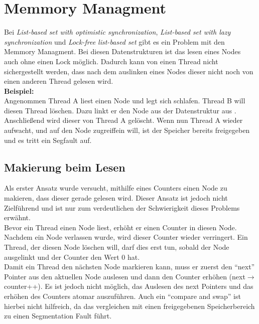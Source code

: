 \section{Memmory Managment}\label{sec:mem}
Bei \textit{List-based set with optimistic synchronization}, \textit{List-based set with lazy synchronization} und \textit{Lock-free list-based set}
gibt es ein Problem mit den Memmory Managment. Bei diesen Datenstrukturen ist das lesen eines Nodes auch ohne einen Lock möglich. 
Dadurch kann von einen Thread nicht sichergestellt werden, dass nach dem auslinken eines Nodes dieser nicht noch von einen anderen Thread gelesen wird.
\\ 
\textbf{Beispiel:}
\\ Angenommen Thread A liest einen Node und legt sich schlafen. Thread B will diesen Thread löschen. Dazu linkt er den Node aus der Datenstruktur aus
. Anschließend wird dieser von Thread A gelöscht. Wenn nun Thread A wieder aufwacht, und auf den Node zugreiffein will, ist der Speicher bereits freigegeben
und es tritt ein Segfault auf. 

\subsection{Makierung beim Lesen}
Als erster Ansatz wurde versucht, mithilfe eines Counters einen Node zu makieren, dass dieser gerade gelesen wird. Dieser Ansatz ist jedoch nicht 
Zielführend und ist nur zum verdeutlichen der Schwierigkeit dieses Problems erwähnt. \\
Bevor ein Thread einen Node liest, erhöht er einen Counter in diesen Node. Nachdem ein Node verlassen wurde, wird dieser Counter wieder verringert.
Ein Thread, der diesen Node löschen will, darf dies erst tun, sobald der Node ausgelinkt und der Counter den Wert 0 hat. \\
Damit ein Thread den nächsten Node markieren kann, muss er zuerst den ``next'' Pointer aus den aktuellen Node auslesen und dann den Counter erhöhen (next$\rightarrow$counter++).
Es ist jedoch nicht möglich, das Auslesen des next Pointers und das erhöhen des Counters atomar auszuführen. Auch ein ``compare and swap'' ist hierbei nicht hilfreich,
da das vergleichen mit einen freigegebenen Speicherbereich zu einen Segmentation Fault führt. 



